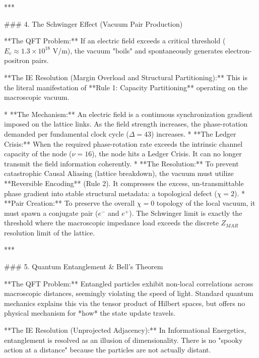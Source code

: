 ***

### 4. The Schwinger Effect (Vacuum Pair Production)

**The QFT Problem:** If an electric field exceeds a critical threshold ($E_c \approx 1.3 \times 10^{18}$ V/m), the vacuum "boils" and spontaneously generates electron-positron pairs. 

**The IE Resolution (Margin Overload and Structural Partitioning):**
This is the literal manifestation of **Rule 1: Capacity Partitioning** operating on the macroscopic vacuum.

*   **The Mechanism:** An electric field is a continuous synchronization gradient imposed on the lattice links. As the field strength increases, the phase-rotation demanded per fundamental clock cycle ($\Delta=43$) increases. 
*   **The Ledger Crisis:** When the required phase-rotation rate exceeds the intrinsic channel capacity of the node ($\nu=16$), the node hits a Ledger Crisis. It can no longer transmit the field information coherently.
*   **The Resolution:** To prevent catastrophic Causal Aliasing (lattice breakdown), the vacuum must utilize **Reversible Encoding** (Rule 2). It compresses the excess, un-transmittable phase gradient into stable structural metadata: a topological defect ($\chi=2$). 
*   **Pair Creation:** To preserve the overall $\chi=0$ topology of the local vacuum, it must spawn a conjugate pair ($e^-$ and $e^+$). The Schwinger limit is exactly the threshold where the macroscopic impedance load exceeds the discrete $Z_{MAR}$ resolution limit of the lattice.

***

### 5. Quantum Entanglement & Bell's Theorem

**The QFT Problem:** Entangled particles exhibit non-local correlations across macroscopic distances, seemingly violating the speed of light. Standard quantum mechanics explains this via the tensor product of Hilbert spaces, but offers no physical mechanism for *how* the state update travels.

**The IE Resolution (Unprojected Adjacency):**
In Informational Energetics, entanglement is resolved as an illusion of dimensionality. There is no "spooky action at a distance" because the particles are not actually distant.

